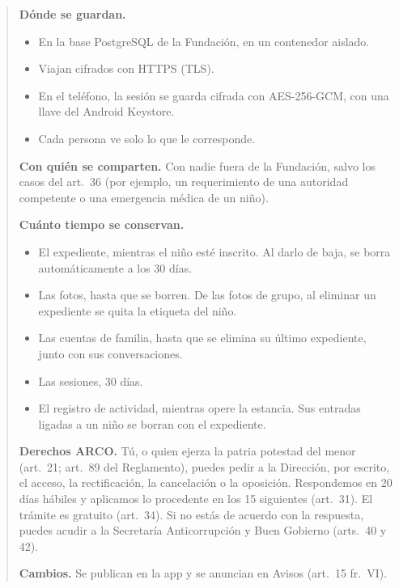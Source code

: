 \begin{quote}
\textbf{Dónde se guardan.}
\begin{itemize}
	\item En la base PostgreSQL de la Fundación, en un contenedor aislado.
	\item Viajan cifrados con HTTPS (TLS).
	\item En el teléfono, la sesión se guarda cifrada con AES-256-GCM, con una llave del Android Keystore.
	\item Cada persona ve solo lo que le corresponde.
\end{itemize}

\textbf{Con quién se comparten.} Con nadie fuera de la Fundación, salvo los casos del art.~36 (por ejemplo, un requerimiento de una autoridad competente o una emergencia médica de un niño).

\textbf{Cuánto tiempo se conservan.}
\begin{itemize}
	\item El expediente, mientras el niño esté inscrito. Al darlo de baja, se borra automáticamente a los 30 días.
	\item Las fotos, hasta que se borren. De las fotos de grupo, al eliminar un expediente se quita la etiqueta del niño.
	\item Las cuentas de familia, hasta que se elimina su último expediente, junto con sus conversaciones.
	\item Las sesiones, 30 días.
	\item El registro de actividad, mientras opere la estancia. Sus entradas ligadas a un niño se borran con el expediente.
\end{itemize}

\textbf{Derechos ARCO.} Tú, o quien ejerza la patria potestad del menor (art.~21; art.~89 del Reglamento), puedes pedir a la Dirección, por escrito, el acceso, la rectificación, la cancelación o la oposición. Respondemos en 20 días hábiles y aplicamos lo procedente en los 15 siguientes (art.~31). El trámite es gratuito (art.~34). Si no estás de acuerdo con la respuesta, puedes acudir a la Secretaría Anticorrupción y Buen Gobierno (arts.~40 y 42).

\textbf{Cambios.} Se publican en la app y se anuncian en Avisos (art.~15 fr.~VI).
\end{quote}

